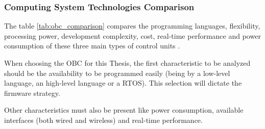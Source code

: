 \subsubsection{Computing System Technologies Comparison}
The table \ref{tab:obc_comparison} compares the programming languages, flexibility, processing power, development complexity, cost, real-time performance and power consumption of these three main types of control units \cite{OBC5}.
\begin{table}[H]
    \centering
    \caption{Comparison of Microcontrollers, Microprocessors, and FPGAs.}
    \label{tab:obc_comparison}
\end{table}

When choosing the \gls{OBC} for this Thesis, the first characteristic to be analyzed should be the availability to be programmed easily (being by a low-level language, an high-level language or a \gls{RTOS}).
This selection will dictate the firmware strategy.

Other characteristics must also be present like power consumption, available interfaces (both wired and wireless) and real-time performance.

